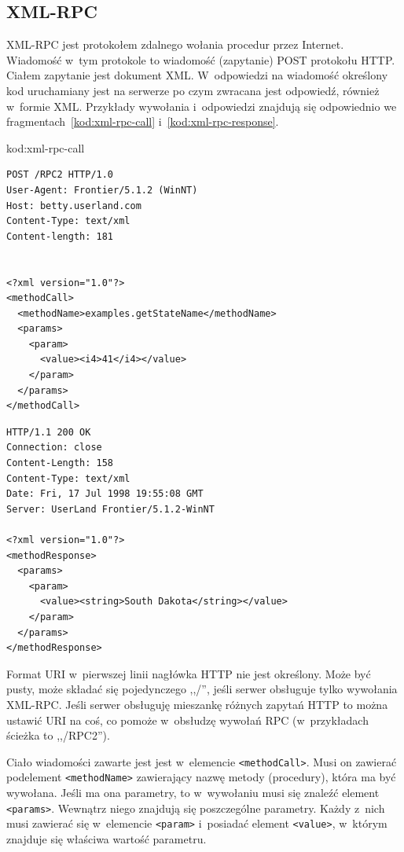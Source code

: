 \subsection{XML-RPC}
XML-RPC jest protokołem zdalnego wołania procedur przez Internet.\cite{xml-rpc}
Wiadomość w~tym protokole to wiadomość (zapytanie) POST protokołu HTTP. Ciałem zapytanie jest dokument XML.
W~odpowiedzi na wiadomość określony kod uruchamiany jest na serwerze po czym zwracana jest odpowiedź, również w~formie XML.
Przykłady wywołania i~odpowiedzi znajdują się odpowiednio we fragmentach~\ref{kod:xml-rpc-call} i~\ref{kod:xml-rpc-response}.

kod:xml-rpc-call
\begin{lstlisting}[float, frame=single, caption={Wywołanie metody XML-RPC.}, label=kod:xml-rpc-call]
POST /RPC2 HTTP/1.0
User-Agent: Frontier/5.1.2 (WinNT)
Host: betty.userland.com
Content-Type: text/xml
Content-length: 181


<?xml version="1.0"?>
<methodCall>
  <methodName>examples.getStateName</methodName>
  <params>
    <param>
      <value><i4>41</i4></value>
    </param>
  </params>
</methodCall>
\end{lstlisting}

\begin{lstlisting}[float, frame=single, caption={Odpowiedź XML-RPC.}, label=kod:xml-rpc-response]
HTTP/1.1 200 OK
Connection: close
Content-Length: 158
Content-Type: text/xml
Date: Fri, 17 Jul 1998 19:55:08 GMT
Server: UserLand Frontier/5.1.2-WinNT

<?xml version="1.0"?>
<methodResponse>
  <params>
    <param>
      <value><string>South Dakota</string></value>
    </param>
  </params>
</methodResponse>
\end{lstlisting}

Format URI w~pierwszej linii nagłówka HTTP nie jest określony. Może być pusty, może składać się pojedynczego ,,/'', jeśli serwer obsługuje tylko wywołania XML-RPC. Jeśli serwer obsługuję mieszankę różnych zapytań HTTP to można ustawić URI na coś, co pomoże w~obsłudzę wywołań RPC (w~przykładach ścieżka to ,,/RPC2'').

Ciało wiadomości zawarte jest jest w~elemencie \texttt{<methodCall>}. Musi on zawierać podelement \texttt{<methodName>} zawierający nazwę metody (procedury), która ma być wywołana.
Jeśli ma ona parametry, to w~wywołaniu musi się znaleźć element \texttt{<params>}. Wewnątrz niego znajdują się poszczególne parametry. Każdy z~nich musi zawierać się w~elemencie \texttt{<param>} i~posiadać element \texttt{<value>}, w~którym znajduje się właściwa wartość parametru.

